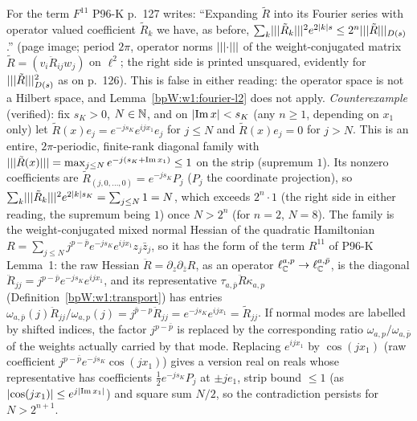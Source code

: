\begin{remark}\label{bpW:w1:operator-fourier}
For the term $F^{11}$ P96-K p.~127 writes: ``Expanding $\tilde R$ into its Fourier series with operator valued
coefficient $\tilde R_k$ we have, as before, $\sum_k\lvert \lvert \lvert \tilde R_k\rvert\rvert\rvert^2e^{2\lvert k\rvert s}\le2^n\lvert \lvert \lvert \tilde R\rvert\rvert\rvert_{D(s)}$.''
(page image; period $2\pi$, operator norms $\lvert \lvert \lvert \cdot\rvert\rvert\rvert$ of the weight-conjugated matrix
$\tilde R=(v_i\ddot R_{ij}w_j)$ on $\ell^2$; the right side is printed unsquared, evidently for
$\lvert \lvert \lvert \tilde R\rvert\rvert\rvert^2_{D(s)}$ as on p.~126). This is false in either reading: the operator space is not a Hilbert space, and
Lemma~\ref{bpW:w1:fourier-l2} does not apply. \emph{Counterexample} (verified): fix $s_K>0$, $N\in\mathbb{N}$, and on
$\lvert \operatorname{Im}x\rvert<s_K$ (any $n\ge1$, depending on $x_1$ only) let $\tilde R(x)e_j=e^{-js_K}e^{ijx_1}e_j$ for
$j\le N$ and $\tilde R(x)e_j=0$ for $j>N$. This is an entire, $2\pi$-periodic, finite-rank diagonal family with
$\lvert \lvert \lvert \tilde R(x)\rvert\rvert\rvert=\max_{j\le N}e^{-j(s_K+\operatorname{Im}x_1)}\le1$ on the strip (supremum $1$). Its nonzero
coefficients are $\tilde R_{(j,0,\dots,0)}=e^{-js_K}P_j$ ($P_j$ the coordinate projection), so
$\sum_k\lvert \lvert \lvert \tilde R_k\rvert\rvert\rvert^2e^{2\lvert k\rvert s_K}=\sum_{j\le N}1=N$, which exceeds $2^n\cdot1$ (the right side in either reading, the supremum being $1$) once $N>2^n$ (for $n=2$,
$N=8$). The family is the weight-conjugated mixed normal Hessian of the quadratic Hamiltonian
$R=\sum_{j\le N}j^{p-\bar p}e^{-js_K}e^{ijx_1}z_j\bar z_j$, so it has the form of the term $R^{11}$ of P96-K Lemma~1:
the raw Hessian $\ddot R=\partial_z\partial_{\bar z}R$, as an operator $\ell^{a,p}_{\mathbb{C}}\to\ell^{a,\bar p}_{\mathbb{C}}$, is the diagonal
$\ddot R_{jj}=j^{p-\bar p}e^{-js_K}e^{ijx_1}$, and its representative $\tau_{a,\bar p}\ddot R\kappa_{a,p}$
(Definition~\ref{bpW:w1:transport}) has entries
$\omega_{a,\bar p}(j)\ddot R_{jj}/\omega_{a,p}(j)=j^{\bar p-p}\ddot R_{jj}=e^{-js_K}e^{ijx_1}=\tilde R_{jj}$. If normal modes are
labelled by shifted indices, the factor $j^{p-\bar p}$ is replaced by the corresponding ratio
$\omega_{a,p}/\omega_{a,\bar p}$ of the weights actually carried by that mode. Replacing $e^{ijx_1}$ by $\cos(jx_1)$ (raw
coefficient $j^{p-\bar p}e^{-js_K}\cos(jx_1)$) gives a version real on reals whose representative has coefficients
$\frac12e^{-js_K}P_j$ at $\pm je_1$, strip bound $\le1$ (as $\lvert \cos(jx_1)\rvert\le e^{j\lvert \operatorname{Im}x_1\rvert}$) and
square sum $N/2$, so the contradiction persists for $N>2^{n+1}$.


\end{remark}
